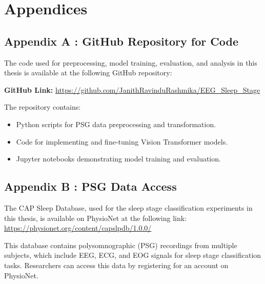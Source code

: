 \chapter*{Appendices}

\section*{Appendix A : GitHub Repository for Code}

The code used for preprocessing, model training, evaluation, and analysis in this thesis is available at the following GitHub repository:

\textbf{GitHub Link:} 
\url{https://github.com/JanithRavinduRashmika/EEG_Sleep_Stage}

The repository contains:

\begin{itemize}
    \item Python scripts for PSG data preprocessing and transformation.
    \item Code for implementing and fine-tuning Vision Transformer models.
    \item Jupyter notebooks demonstrating model training and evaluation.
\end{itemize}

\section*{Appendix B : PSG Data Access}

The CAP Sleep Database, used for the sleep stage classification experiments in this thesis, is available on PhysioNet at the following link: 
\url{https://physionet.org/content/capslpdb/1.0.0/}


This database contains polysomnographic (PSG) recordings from multiple subjects, which include EEG, ECG, and EOG signals for sleep stage classification tasks. Researchers can access this data by registering for an account on PhysioNet.
 